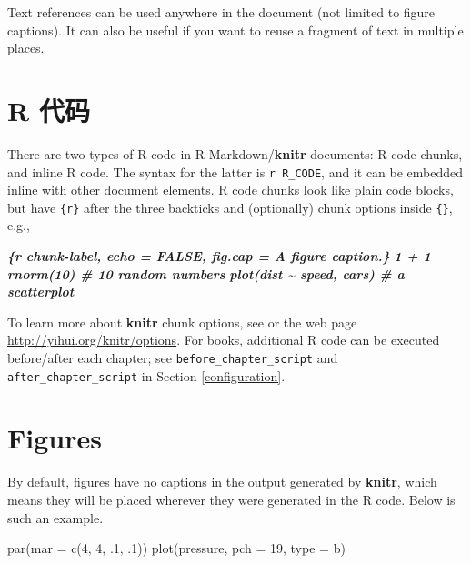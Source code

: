 \documentclass[
  12pt,
]{krantz}
\newenvironment{Shaded}{\begin{snugshade}}{\end{snugshade}}
\newcommand{\AttributeTok}[1]{\textcolor[rgb]{0.77,0.63,0.00}{#1}}
\newcommand{\DecValTok}[1]{\textcolor[rgb]{0.00,0.00,0.81}{#1}}
\newcommand{\FunctionTok}[1]{\textcolor[rgb]{0.00,0.00,0.00}{#1}}
\newcommand{\InformationTok}[1]{\textcolor[rgb]{0.56,0.35,0.01}{\textbf{\textit{#1}}}}
\newcommand{\NormalTok}[1]{#1}
\newcommand{\StringTok}[1]{\textcolor[rgb]{0.31,0.60,0.02}{#1}}
\theoremstyle{definition}
\theoremstyle{definition}
\theoremstyle{definition}
\theoremstyle{definition}
\theoremstyle{remark}
\begin{document}
Text references can be used anywhere in the document (not limited to figure captions). It can also be useful if you want to reuse a fragment of text in multiple places.

\hypertarget{r-ux4ee3ux7801}{%
\section{R 代码}\label{r-ux4ee3ux7801}}

There are two types of R code in R Markdown/\textbf{knitr} documents: R code chunks, and inline R code. The syntax for the latter is \texttt{\textasciigrave{}r\ R\_CODE\textasciigrave{}}, and it can be embedded inline with other document elements. R code chunks look like plain code blocks, but have \texttt{\{r\}} after the three backticks and (optionally) chunk options inside \texttt{\{\}}, e.g.,

\begin{Shaded}
\begin{Highlighting}[]
\InformationTok{\textasciigrave{}\textasciigrave{}\textasciigrave{}\{r chunk{-}label, echo = FALSE, fig.cap = \textquotesingle{}A figure caption.\textquotesingle{}\}}
\InformationTok{1 + 1}
\InformationTok{rnorm(10)  \# 10 random numbers}
\InformationTok{plot(dist \textasciitilde{} speed, cars)  \# a scatterplot}
\InformationTok{\textasciigrave{}\textasciigrave{}\textasciigrave{}}
\end{Highlighting}
\end{Shaded}

To learn more about \textbf{knitr} chunk options, see \citet{xie2015} or the web page \url{http://yihui.org/knitr/options}. For books, additional R code can be executed before/after each chapter; see \texttt{before\_chapter\_script} and \texttt{after\_chapter\_script} in Section \ref{configuration}.

\hypertarget{figures}{%
\section{Figures}\label{figures}}

By default, figures have no captions in the output generated by \textbf{knitr}, which means they will be placed wherever they were generated in the R code. Below is such an example.

\begin{Shaded}
\begin{Highlighting}[]
\FunctionTok{par}\NormalTok{(}\AttributeTok{mar =} \FunctionTok{c}\NormalTok{(}\DecValTok{4}\NormalTok{, }\DecValTok{4}\NormalTok{, .}\DecValTok{1}\NormalTok{, .}\DecValTok{1}\NormalTok{))}
\FunctionTok{plot}\NormalTok{(pressure, }\AttributeTok{pch =} \DecValTok{19}\NormalTok{, }\AttributeTok{type =} \StringTok{\textquotesingle{}b\textquotesingle{}}\NormalTok{)}
\end{Highlighting}
\end{Shaded}
\end{document}
